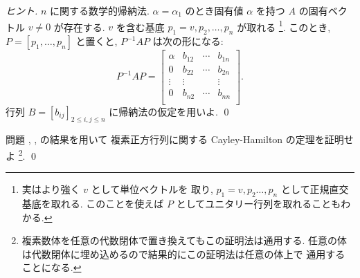 \documentclass[12pt,twoside]{jarticle}
\begin{document}
\begin{proof}[ヒント]
  $n$ に関する数学的帰納法. 
  $\alpha=\alpha_1$ のとき固有値 $\alpha$ を持つ $A$ の固有ベクトル $v\ne 0$ 
  が存在する. $v$ を含む基底 $p_1=v,p_2,\dots,p_n$ が取れる%
  \footnote{実はより強く $v$ として単位ベクトルを
    取り, $p_1=v,p_2\ldots,p_n$ として正規直交基底を取れる.
    このことを使えば $P$ としてユニタリー行列を取れることもわかる.}.  
  このとき, $P=[p_1,\ldots,p_n]$ と置くと, $P^{-1}AP$ は次の形になる:
  \begin{equation*}
    P^{-1}AP = 
    \begin{bmatrix}
      \alpha & b_{12} & \cdots & b_{1n} \\
         0   & b_{22} & \cdots & b_{2n} \\
      \vdots & \vdots &        & \vdots \\
         0   & b_{n2} & \cdots & b_{nn} \\
    \end{bmatrix}.
  \end{equation*}
  行列 $B=[b_{ij}]_{2\le i,j\le n}$ に帰納法の仮定を用いよ.
  \qed
\end{proof}


\begin{question}
  \label{q:CH-tri}
  問題 , , 
   の結果を用いて
  複素正方行列に関する Cayley-Hamilton の定理を証明せよ%
  \footnote{複素数体を任意の代数閉体で置き換えてもこの証明法は通用する.
    任意の体は代数閉体に埋め込めるので結果的にこの証明法は任意の体上で
    通用することになる.}. \qed
\end{question}
\end{document}
